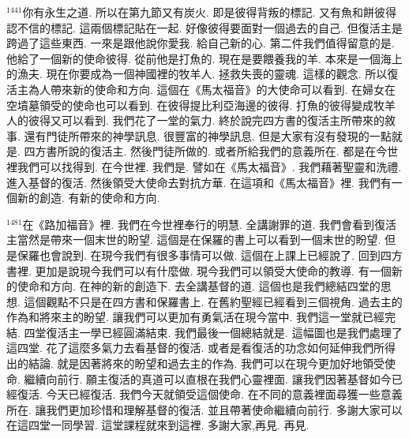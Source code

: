 \documentclass{book}
\begin{document}
$^{1441}$你有永生之道.
所以在第九節又有炭火.
即是彼得背叛的標記.
又有魚和餅彼得認不信的標記.
這兩個標記貼在一起.
好像彼得要面對一個過去的自己.
但復活主是跨過了這些東西.
一來是跟他說你愛我.
給自己新的心.
第二件我們值得留意的是.
他給了一個新的使命彼得.
從前他是打魚的.
現在是要餵養我的羊.
本來是一個海上的漁夫.
現在你要成為一個神國裡的牧羊人.
拯救失喪的靈魂.
這樣的觀念.
所以復活主為人帶來新的使命和方向.
這個在《馬太福音》的大使命可以看到.
在婦女在空墳墓領受的使命也可以看到.
在彼得提比利亞海邊的彼得.
打魚的彼得變成牧羊人的彼得又可以看到.
我們花了一堂的氣力.
終於說完四方書的復活主所帶來的敘事.
還有門徒所帶來的神學訊息.
很豐富的神學訊息.
但是大家有沒有發現的一點就是.
四方書所說的復活主.
然後門徒所做的.
或者所給我們的意義所在.
都是在今世裡我們可以找得到.
在今世裡.
我們是.
譬如在《馬太福音》.
我們藉著聖靈和洗禮.
進入基督的復活.
然後領受大使命去對抗方華.
在這項和《馬太福音》裡.
我們有一個新的創造.
有新的使命和方向.

$^{1481}$在《路加福音》裡.
我們在今世裡奉行的明慧.
全講謝罪的道.
我們會看到復活主當然是帶來一個末世的盼望.
這個是在保羅的書上可以看到一個末世的盼望.
但是保羅也會說到.
在現今我們有很多事情可以做.
這個在上課上已經說了.
回到四方書裡.
更加是說現今我們可以有什麼做.
現今我們可以領受大使命的教導.
有一個新的使命和方向.
在神的新的創造下.
去全講基督的道.
這個也是我們總結四堂的思想.
這個觀點不只是在四方書和保羅書上.
在舊約聖經已經看到三個視角.
過去主的作為和將來主的盼望.
讓我們可以更加有勇氣活在現今當中.
我們這一堂就已經完結.
四堂復活主一學已經圓滿結束.
我們最後一個總結就是.
這幅圖也是我們處理了這四堂.
花了這麼多氣力去看基督的復活.
或者是看復活的功念如何延伸我們所得出的結論.
就是因著將來的盼望和過去主的作為.
我們可以在現今更加好地領受使命.
繼續向前行.
願主復活的真道可以直根在我們心靈裡面.
讓我們因著基督如今已經復活.
今天已經復活.
我們今天就領受這個使命.
在不同的意義裡面尋獲一些意義所在.
讓我們更加珍惜和理解基督的復活.
並且帶著使命繼續向前行.
多謝大家可以在這四堂一同學習.
這堂課程就來到這裡.
多謝大家,再見.
再見.
\newpage
\end{document}
